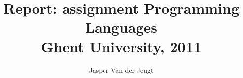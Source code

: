 \author{Jasper Van der Jeugt}
\title{Report: assignment Programming Languages \\
    Ghent University, 2011
}

\maketitle
